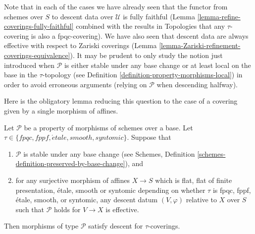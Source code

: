 \noindent
Note that in each of the cases we have already seen that
the functor from schemes over $S$ to descent data over
$\mathcal{U}$ is fully faithful 
(Lemma \ref{lemma-refine-coverings-fully-faithful} combined
with the results in Topologies that any $\tau$-covering
is also a fpqc-covering).
We have also seen that descent data are always effective with
respect to Zariski coverings
(Lemma \ref{lemma-Zariski-refinement-coverings-equivalence}).
It may be prudent to only study the notion just introduced
when $\mathcal{P}$ is either stable under any base change or at least
local on the base in the $\tau$-topology
(see Definition \ref{definition-property-morphisms-local})
in order to avoid erroneous arguments (relying on $\mathcal{P}$
when descending halfway).

\medskip\noindent
Here is the obligatory lemma reducing this question
to the case of a covering given by a single morphism of affines.

\begin{lemma}
\label{lemma-descending-types-morphisms}
Let $\mathcal{P}$ be a property of morphisms of schemes over a base.
Let $\tau \in \{fpqc, fppf, \acute{e}tale, smooth, syntomic\}$.
Suppose that
\begin{enumerate}
\item $\mathcal{P}$ is stable under any base change
(see Schemes, Definition \ref{schemes-definition-preserved-by-base-change}),
and
\item for any surjective morphism of affines
$X \to S$ which is flat, flat of finite presentation,
\'etale, smooth or syntomic depending on whether $\tau$ is
fpqc, fppf, \'etale, smooth, or syntomic,
any descent datum $(V, \varphi)$ relative
to $X$ over $S$ such that $\mathcal{P}$ holds for
$V \to X$ is effective.
\end{enumerate}
Then morphisms of type $\mathcal{P}$ satisfy descent for $\tau$-coverings.
\end{lemma}

